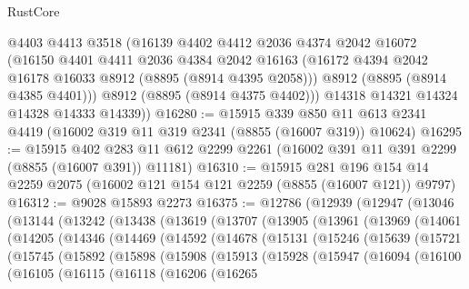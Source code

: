 \begin{lexlean}{RustCore}
\begin{coremodule}
        @4403
        @4413
        @3518
        (@16139
          @4402
          @4412
          @2036
          @4374
          @2042
          @16072
          (@16150
            @4401
            @4411
            @2036
            @4384
            @2042
            @16163
            (@16172 @4394 @2042 @16178 @16033 @8912 (@8895 (@8914 @4395 @2058)))
            @8912
            (@8895 (@8914 @4385 @4401)))
          @8912
          (@8895 (@8914 @4375 @4402)))
        @14318
        @14321
        @14324
        @14328
        @14333
        @14339))
@16280 := @15915
    @339
    @850
    @11
    @613
    @2341
    @4419
    (@16002 @319 @11 @319 @2341 (@8855 (@16007 @319)) @10624)
@16295 := @15915
    @402
    @283
    @11
    @612
    @2299
    @2261
    (@16002 @391 @11 @391 @2299 (@8855 (@16007 @391)) @11181)
@16310 := @15915
    @281
    @196
    @154
    @14
    @2259
    @2075
    (@16002 @121 @154 @121 @2259 (@8855 (@16007 @121)) @9797)
@16312 := @9028 @15893 @2273
@16375 := @12786
    (@12939
      (@12947
        (@13046
          (@13144
            (@13242
              (@13438
                (@13619
                  (@13707
                    (@13905
                      (@13961
                        (@13969
                          (@14061
                            (@14205
                              (@14346
                                (@14469
                                  (@14592
                                    (@14678
                                      (@15131
                                        (@15246
                                          (@15639
                                            (@15721
                                              (@15745
                                                (@15892
                                                  (@15898
                                                    (@15908
                                                      (@15913
                                                        (@15928
                                                          (@15947
                                                            (@16094
                                                              (@16100
                                                                (@16105
                                                                  (@16115
                                                                    (@16118
                                                                      (@16206
                                                                        (@16265

\end{coremodule}
\end{lexlean}
